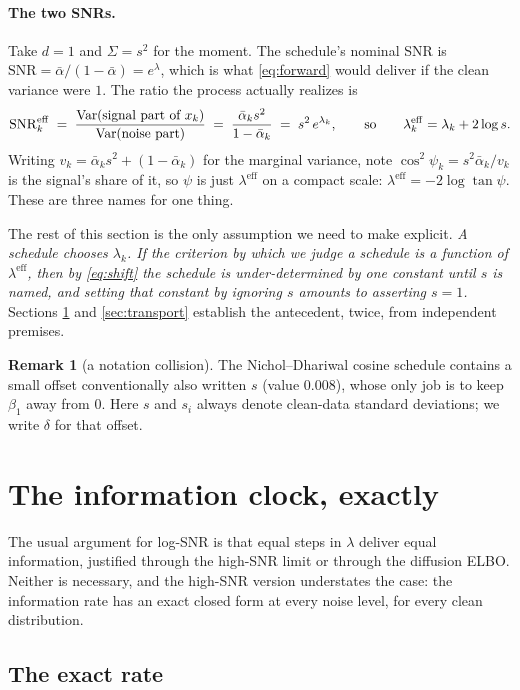 \documentclass[11pt]{article}
\theoremstyle{definition}
\newtheorem{remark}[proposition]{Remark}
\newcommand{\abar}{\bar\alpha}
\newcommand{\snr}{\mathrm{SNR}}
\newcommand{\Var}{\mathrm{Var}}
\newcommand{\leff}{\lambda^{\mathrm{eff}}}
\begin{document}
\paragraph{The two SNRs.} Take $d=1$ and $\Sigma=s^2$ for the moment. The
schedule's nominal SNR is $\snr=\abar/(1-\abar)=e^{\lambda}$, which is what
\eqref{eq:forward} would deliver if the clean variance were $1$. The ratio the
process actually realizes is
\begin{equation}
  \snr^{\rm eff}_k
  \;=\; \frac{\Var(\text{signal part of }x_k)}{\Var(\text{noise part})}
  \;=\; \frac{\abar_k s^2}{1-\abar_k}
  \;=\; s^2\,e^{\lambda_k},
  \qquad\text{so}\qquad
  \leff_k=\lambda_k+2\log s .
  \label{eq:shift}
\end{equation}
Writing $v_k=\abar_ks^2+(1-\abar_k)$ for the marginal variance, note
$\cos^2\psi_k=s^2\abar_k/v_k$ is the signal's share of it, so $\psi$ is just
$\leff$ on a compact scale: $\leff=-2\log\tan\psi$. These are three names for
one thing.

The rest of this section is the only assumption we need to make explicit.
\emph{A schedule chooses $\lambda_k$. If the criterion by which we judge a
schedule is a function of $\leff$, then by \eqref{eq:shift} the schedule is
under-determined by one constant until $s$ is named, and setting that constant
by ignoring $s$ amounts to asserting $s=1$.} Sections \ref{sec:info} and
\ref{sec:transport} establish the antecedent, twice, from independent premises.

\begin{remark}[a notation collision]
The Nichol--Dhariwal cosine schedule contains a small offset conventionally
also written $s$ (value $0.008$), whose only job is to keep $\beta_1$ away from
$0$. Here $s$ and $s_i$ always denote clean-data standard deviations; we write
$\delta$ for that offset.
\end{remark}

\section{The information clock, exactly}
\label{sec:info}

The usual argument for log-SNR is that equal steps in $\lambda$ deliver equal
information, justified through the high-SNR limit or through the diffusion
ELBO. Neither is necessary, and the high-SNR version understates the case: the
information rate has an exact closed form at every noise level, for every clean
distribution.

\subsection{The exact rate}
\end{document}
